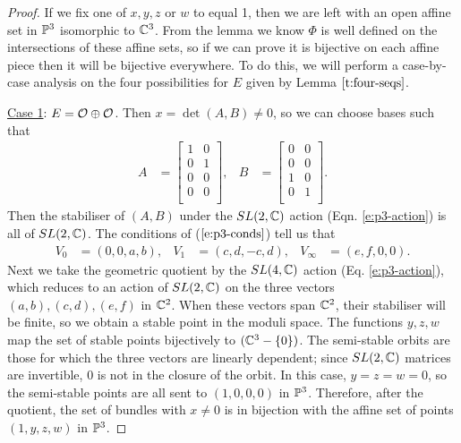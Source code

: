 	\begin{proof}
		If we fix one of $x,y,z$ or $w$ to equal 1, then we are left with an open affine set in $\mathbb{P}^3$ isomorphic to $\mathbb{C}^3$. From the lemma we know $\Phi$ is well defined on the intersections of these affine sets, so if we can prove it is bijective on each affine piece then it will be bijective everywhere. To do this, we will perform a case-by-case analysis on the four possibilities for $E$ given by Lemma $\ref{t:four-seqs}$.
		
		\underline{Case 1}: $E = \mathcal{O}\oplus \mathcal{O}$. Then $x = \det(A,B) \neq 0$, so we can choose bases such that
		\begin{align*}
			A &= \begin{bmatrix}
			1 & 0\\
			0 & 1\\
			0 & 0\\
			0 & 0\\
			\end{bmatrix}, & 
			B &= \begin{bmatrix}
			0 & 0\\
			0 & 0\\
			1 & 0\\
			0 & 1\\
			\end{bmatrix}.
		\end{align*}
		Then the stabiliser of $(A,B)$ under the $SL(2,\mathbb{C})$ action (Eqn. \ref{e:p3-action}) is all of $SL(2,\mathbb{C})$. The conditions of ($\ref{e:p3-conds}$) tell us that 
		\begin{align}
			V_0 &= (0,0,a,b), & V_1 &= (c,d,-c,d), & V_\infty &=(e,f,0,0).
		\end{align}
		Next we take the geometric quotient by the $SL(4,\mathbb{C})$ action (Eq. \ref{e:p3-action}), which reduces to an action of $SL(2,\mathbb{C})$ on the three vectors $(a,b),(c,d),(e,f)$ in $\mathbb{C}^2$. When these vectors span $\mathbb{C}^2$, their stabiliser will be finite, so we obtain a stable point in the moduli space. The functions $y,z,w$ map the set of stable points bijectively to $(\mathbb{C}^3 - \{0\})$. The semi-stable orbits are those for which the three vectors are linearly dependent; since $SL(2,\mathbb{C})$ matrices are invertible, $0$ is not in the closure of the orbit. In this case, $y = z = w = 0$, so the semi-stable points are all sent to $(1,0,0,0)$ in $\mathbb{P}^3$. Therefore, after the quotient, the set of bundles with $x \neq 0$ is in bijection with the affine set of points $(1,y,z,w)$ in $\mathbb{P}^3$.
		

\end{proof}
